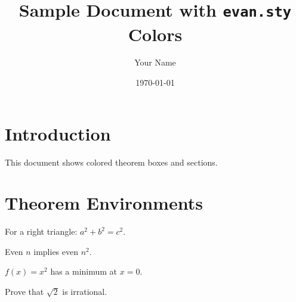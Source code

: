 \documentclass{scrartcl} %
\title{Sample Document with \texttt{evan.sty} Colors}
\author{Your Name}
\date{\today}
\begin{document}
\maketitle

\section{Introduction} %
This document shows colored theorem boxes and sections.

\section{Theorem Environments}

\begin{theorem}[Pythagoras]
    For a right triangle: \( a^2 + b^2 = c^2 \).
\end{theorem}

\begin{claim}
    Even \( n \) implies even \( n^2 \).
\end{claim}

\begin{example}
    \( f(x) = x^2 \) has a minimum at \( x = 0 \).
\end{example}

\begin{exercise}
    Prove that \( \sqrt{2} \) is irrational.
\end{exercise}
\end{document}
